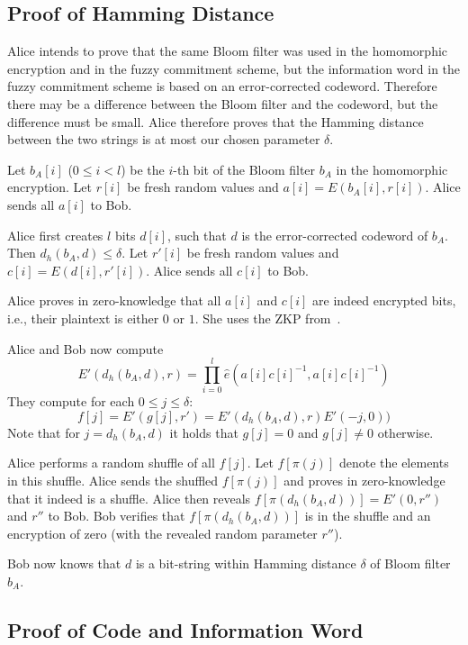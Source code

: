 \documentclass{llncs}
\begin{document}
\subsection{Proof of Hamming Distance}
\label{sec:zkphamming}

Alice intends to prove that the same Bloom filter was used in the homomorphic encryption and in the fuzzy commitment scheme, but the information word in the fuzzy commitment scheme is based on an error-corrected codeword.
Therefore there may be a difference between the Bloom filter and the codeword, but the difference must be small.
Alice therefore proves that the Hamming distance between the two strings is at most our chosen parameter $\delta$.


Let $b_A[i]$ ($0 \leq i < l$) be the $i$-th bit of the Bloom filter $b_A$ in the homomorphic encryption.
Let $r[i]$ be fresh random values and $a[i] = E(b_A[i], r[i])$.
Alice sends all $a[i]$ to Bob.

Alice first creates $l$ bits $d[i]$, such that $d$ is the error-corrected codeword of $b_A$.
Then $d_h(b_A, d) \leq \delta$.
Let $r'[i]$ be fresh random values and $c[i] = E(d[i], r'[i])$.
Alice sends all $c[i]$ to Bob.

Alice proves in zero-knowledge that all $a[i]$ and $c[i]$ are indeed encrypted bits, i.e., their plaintext is either $0$ or $1$.
She uses the ZKP from~\cite{DamJur01}.

Alice and Bob now compute
$$
E'(d_h(b_A, d), r) = \prod_{i = 0}^{l} \hat{e}(a[i] c[i]^{-1}, a[i] c[i]^{-1})
$$
They compute for each $0 \leq j \leq \delta$:
$$
f[j] = E'(g[j], r') = E'(d_h(b_A, d), r) E'(-j, 0))
$$
Note that for $j = d_h(b_A, d)$ it holds that $g[j] = 0$ and $g[j] \neq 0$ otherwise.

Alice performs a random shuffle of all $f[j]$.
Let $f[{\pi(j)}]$ denote the elements in this shuffle.
Alice sends the shuffled $f[{\pi(j)}]$ and proves in zero-knowledge that it indeed is a shuffle.
Alice then reveals $f[{\pi(d_h(b_A, d))}] = E'(0, r'')$ and $r''$ to Bob.
Bob verifies that $f[{\pi(d_h(b_A, d))}]$ is in the shuffle and an encryption of zero (with the revealed random parameter $r''$).

Bob now knows that $d$ is a bit-string within Hamming distance $\delta$ of Bloom filter $b_A$.

\subsection{Proof of Code and Information Word}
\label{sec:zkpcode}
\end{document}
